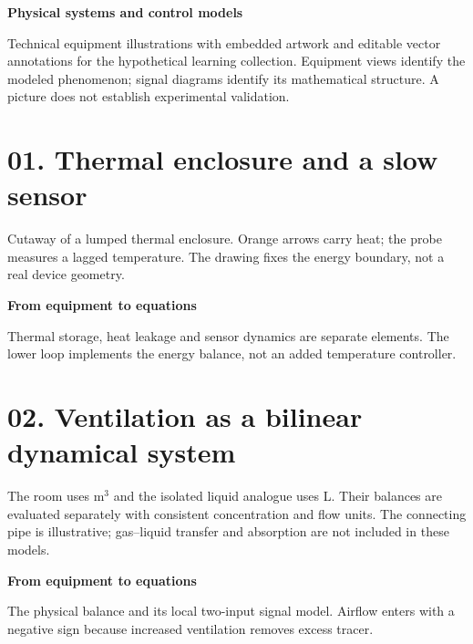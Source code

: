 \documentclass[10pt,a4paper]{article}
\begin{document}
{\Huge\color{ink}\bfseries Physical systems and control models}\par
Technical equipment illustrations with embedded artwork and editable vector annotations for the hypothetical learning collection. Equipment views identify the modeled phenomenon; signal diagrams identify its mathematical structure. A picture does not establish experimental validation.
\section*{01. Thermal enclosure and a slow sensor}
\begin{center}\resizebox{.88\linewidth}{!}{}\par{\small Cutaway of a lumped thermal enclosure. Orange arrows carry heat; the probe measures a lagged temperature. The drawing fixes the energy boundary, not a real device geometry.}\end{center}
\medskip\textbf{From equipment to equations}\par
\begin{center}\resizebox{\ifdim\width>.98\linewidth.98\linewidth\else\width\fi}{!}{}\par{\small Thermal storage, heat leakage and sensor dynamics are separate elements. The lower loop implements the energy balance, not an added temperature controller.}\end{center}

\newpage
\section*{02. Ventilation as a bilinear dynamical system}
\begin{center}\resizebox{.88\linewidth}{!}{}\par{\small The room uses m$^3$ and the isolated liquid analogue uses L. Their balances are evaluated separately with consistent concentration and flow units. The connecting pipe is illustrative; gas--liquid transfer and absorption are not included in these models.}\end{center}
\medskip\textbf{From equipment to equations}\par
\begin{center}\resizebox{\ifdim\width>.98\linewidth.98\linewidth\else\width\fi}{!}{}\par{\small The physical balance and its local two-input signal model. Airflow enters with a negative sign because increased ventilation removes excess tracer.}\end{center}
\end{document}
